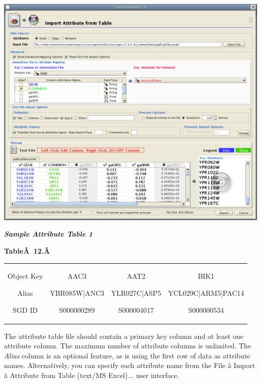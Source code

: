  \includegraphics[scale=1]{images/attribute_table_import_main.png} 

 \emph{\textbf{Sample Attribute Table 1} }

 \textbf{Table\^A 12.\^A }

\begin{tabular}{|c|c|c|c|}
\hline 
 & & & \\
\hline 

 Object Key


 Alias


 SGD ID
 &

 AAC3


 YBR085W|ANC3


 S000000289
 &

 AAT2


 YLR027C|ASP5


 S000004017
 &

 BIK1


 YCL029C|ARM5|PAC14


 S000000534
 \\
 \hline 

\end{tabular}

 The attribute table file should contain a primary key column and at least one attribute column. The maximum number of attribute columns is unlimited. The \emph{Alias}
 column is an optional feature, as is using the first row of data as attribute names. Alternatively, you can specify each attribute name from the File \^a Import \^a Attribute from Table (text/MS Excel)... user interface. 


